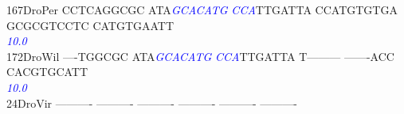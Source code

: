 \documentclass[11pt,twoside,reqno,a4paper]{article}
\begin{document}
{167\hspace*{1\charwidth}DroPer	CCTCAGGCGC	ATA\textit{\textcolor{Blue}{G}}\textit{\textcolor{Blue}{C}}\textit{\textcolor{Blue}{A}}\textit{\textcolor{Blue}{C}}\textit{\textcolor{Blue}{A}}\textit{\textcolor{Blue}{T}}\textit{\textcolor{Blue}{G}}	\textit{\textcolor{Blue}{C}}\textit{\textcolor{Blue}{C}}\textit{\textcolor{Blue}{A}}TTGATTA	CCATGTGTGA	GCGCGTCCTC	CATGTGAATT	\\
\hspace*{4\charwidth}\hspace*{7\charwidth}\hspace*{1\charwidth}\hspace*{13\charwidth}\textit{\textcolor{Blue}{10.0}}\hspace*{1\charwidth}\hspace*{1\charwidth}\hspace*{1\charwidth}\hspace*{1\charwidth}\hspace*{1\charwidth}\\
172\hspace*{1\charwidth}DroWil	----TGGCGC	ATA\textit{\textcolor{Blue}{G}}\textit{\textcolor{Blue}{C}}\textit{\textcolor{Blue}{A}}\textit{\textcolor{Blue}{C}}\textit{\textcolor{Blue}{A}}\textit{\textcolor{Blue}{T}}\textit{\textcolor{Blue}{G}}	\textit{\textcolor{Blue}{C}}\textit{\textcolor{Blue}{C}}\textit{\textcolor{Blue}{A}}TTGATTA	T---------	-------ACC	CACGTGCATT	\\
\hspace*{4\charwidth}\hspace*{7\charwidth}\hspace*{1\charwidth}\hspace*{13\charwidth}\textit{\textcolor{Blue}{10.0}}\hspace*{1\charwidth}\hspace*{1\charwidth}\hspace*{1\charwidth}\hspace*{1\charwidth}\hspace*{1\charwidth}\\
24\hspace*{2\charwidth}DroVir	----------	----------	----------	----------	----------	----------	\\
\hspace*{4\charwidth}\hspace*{7\charwidth}\hspace*{1\charwidth}\hspace*{1\charwidth}\hspace*{1\charwidth}\hspace*{1\charwidth}\hspace*{1\charwidth}\hspace*{1\charwidth}\\
}
\end{document}
